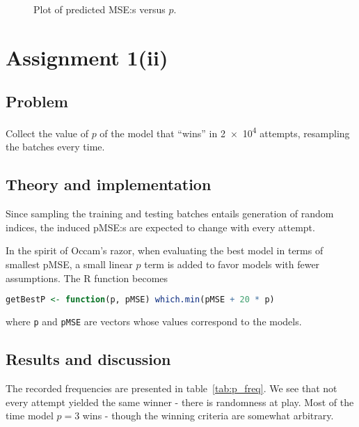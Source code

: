 \documentclass[11pt, a4paper]{article}
\begin{document}
\begin{figure}
	\centering
	
	\caption{Plot of predicted MSE:s versus $p$. \label{fig:p_pMSE}}
\end{figure}

\section{Assignment 1(ii)}\label{sec:p_freq}
\subsection{Problem}
Collect the value of $p$ of the model that ``wins'' in \num{2e4} attempts,
resampling the batches every time.
\subsection{Theory and implementation}
Since sampling the training and testing batches entails generation of random indices,
the induced pMSE:s are expected to change with every attempt.

In the spirit of Occam's razor,
when evaluating the best model in terms of smallest pMSE,
a small linear $p$ term is added to favor models with fewer assumptions.
The R function becomes
\begin{lstlisting}[language=R]
getBestP <- function(p, pMSE) which.min(pMSE + 20 * p)
\end{lstlisting}
where \texttt{p} and \texttt{pMSE} are vectors whose values correspond to the models.
\subsection{Results and discussion}
The recorded frequencies are presented in table~\ref{tab:p_freq}.
We see that not every attempt yielded the same winner - there is randomness at play.
Most of the time model $p=3$ wins - though the winning criteria are somewhat arbitrary.
\end{document}
